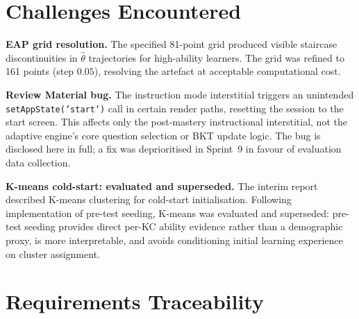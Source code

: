 \section{Challenges Encountered}
\label{sec:impl_challenges}

\textbf{EAP grid resolution.} The specified 81-point grid produced visible
staircase discontinuities in $\hat{\theta}$ trajectories for high-ability
learners. The grid was refined to 161 points (step $0.05$), resolving the
artefact at acceptable computational cost.

\textbf{Review Material bug.} The instruction mode interstitial triggers
an unintended \texttt{setAppState('start')} call in certain render paths,
resetting the session to the start screen. This affects only the post-mastery
instructional interstitial, not the adaptive engine's core question selection
or BKT update logic. The bug is disclosed here in full; a fix was deprioritised
in Sprint~9 in favour of evaluation data collection.

\textbf{K-means cold-start: evaluated and superseded.} The interim report
described K-means clustering for cold-start initialisation. Following
implementation of pre-test seeding, K-means was evaluated and superseded:
pre-test seeding provides direct per-KC ability evidence rather than a
demographic proxy, is more interpretable, and avoids conditioning initial
learning experience on cluster assignment.

\section{Requirements Traceability}
\label{sec:impl_traceability}

